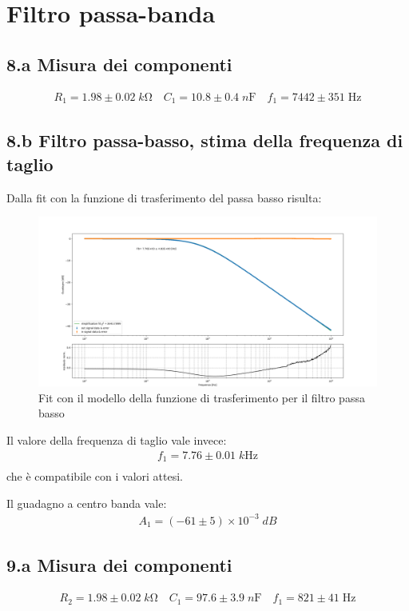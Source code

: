 \documentclass[10pt,a4paper]{article}
\begin{document}
\section*{Filtro passa-banda}

\subsection*{8.a Misura dei componenti}
\begin{align*}
R_1 = 1.98 \pm 0.02 \; \si{k\ohm} \quad C_1 = 10.8 \pm 0.4 \; \si{n\F} \quad
f_1 = 7442 \pm 351 \; \si{\Hz}
\end{align*}

\subsection*{8.b Filtro passa-basso, stima della frequenza di taglio}
Dalla fit con la funzione di trasferimento del passa basso risulta:
\begin{figure}[htb]
\centering
\includegraphics[scale=0.35]{passa_basso}
\caption{Fit con il modello della funzione di trasferimento per il filtro passa basso}
\end{figure}
Il valore della frequenza di taglio vale invece:
\begin{align*}
f_1 = 7.76 \pm 0.01 \; \si{k\Hz}\\
\end{align*}
che è compatibile con i valori attesi.

Il guadagno a centro banda vale:
\begin{align*}
A_1 = (-61 \pm 5) \times 10^{-3} \; \si{dB}
\end{align*}

\subsection*{9.a Misura dei componenti}
\begin{align*}
R_2 = 1.98 \pm 0.02 \; \si{k\ohm} \quad C_1 = 97.6 \pm 3.9 \; \si{n\F} \quad
f_1 = 821 \pm 41 \; \si{\Hz}
\end{align*}
\end{document}
